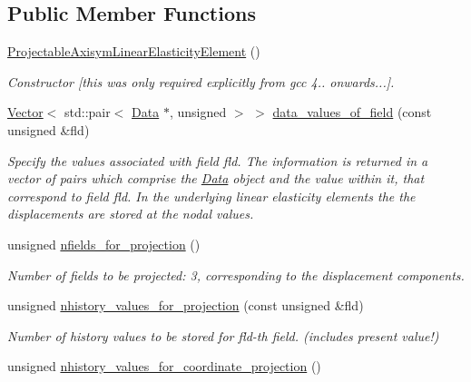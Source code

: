 \subsection*{Public Member Functions}
\begin{DoxyCompactItemize}
\item 
\hyperlink{classoomph_1_1ProjectableAxisymLinearElasticityElement_a766f5fc9a53b9eb9e385021c5673e531}{Projectable\+Axisym\+Linear\+Elasticity\+Element} ()
\begin{DoxyCompactList}\small\item\em Constructor \mbox{[}this was only required explicitly from gcc 4.. onwards...\mbox{]}. \end{DoxyCompactList}\item 
\hyperlink{classoomph_1_1Vector}{Vector}$<$ std\+::pair$<$ \hyperlink{classoomph_1_1Data}{Data} $\ast$, unsigned $>$ $>$ \hyperlink{classoomph_1_1ProjectableAxisymLinearElasticityElement_aa2fdf62a0479bffad602ff39df9c7697}{data\+\_\+values\+\_\+of\+\_\+field} (const unsigned \&fld)
\begin{DoxyCompactList}\small\item\em Specify the values associated with field fld. The information is returned in a vector of pairs which comprise the \hyperlink{classoomph_1_1Data}{Data} object and the value within it, that correspond to field fld. In the underlying linear elasticity elements the the displacements are stored at the nodal values. \end{DoxyCompactList}\item 
unsigned \hyperlink{classoomph_1_1ProjectableAxisymLinearElasticityElement_ae470acc9389f7737d54f27751593429e}{nfields\+\_\+for\+\_\+projection} ()
\begin{DoxyCompactList}\small\item\em Number of fields to be projected\+: 3, corresponding to the displacement components. \end{DoxyCompactList}\item 
unsigned \hyperlink{classoomph_1_1ProjectableAxisymLinearElasticityElement_ac728e9dd1f32500ecabd559f4f457fd6}{nhistory\+\_\+values\+\_\+for\+\_\+projection} (const unsigned \&fld)
\begin{DoxyCompactList}\small\item\em Number of history values to be stored for fld-\/th field. (includes present value!) \end{DoxyCompactList}\item 
unsigned \hyperlink{classoomph_1_1ProjectableAxisymLinearElasticityElement_a56a9ecb113858a8ab28a1125e879416d}{nhistory\+\_\+values\+\_\+for\+\_\+coordinate\+\_\+projection} ()

\end{DoxyCompactItemize}
